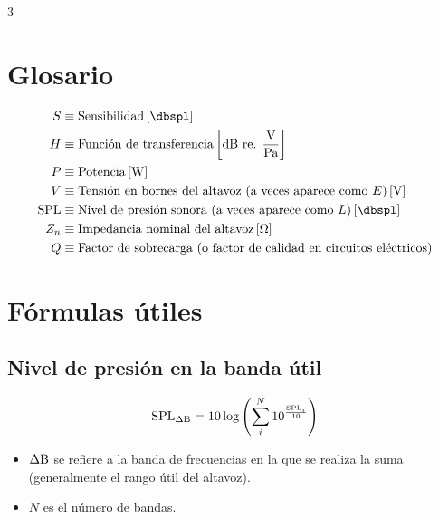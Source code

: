 \documentclass[a4paper, 8pt]{extarticle}
\begin{document}
\setlength{\parskip}{0pt}
\setlength{\parindent}{0pt}
\pagestyle{empty}
\renewcommand{\arraystretch}{1.5}

\begin{multicols}{3}
    \section{Glosario}
    \[
        \begin{alignedat}{2}
            S          & \equiv \text{Sensibilidad}  \left[ \unit{\dbspl} \right]                                                  \\
            H          & \equiv \text{Función de transferencia}  \left[ \unit{\dB} \text{ re. }\unit{\volt\per\pascal} \right]     \\
            P          & \equiv \text{Potencia} \left[ \unit{\watt} \right]                                                        \\
            V          & \equiv \text{Tensión en bornes del altavoz (a veces aparece como } E \text{)} \left[ \unit{\volt} \right] \\
            \text{SPL} & \equiv \text{Nivel de presión sonora (a veces aparece como } L \text{)} \left[ \unit{\dbspl} \right]      \\
            Z_n        & \equiv \text{Impedancia nominal del altavoz} \left[ \unit{\ohm} \right]                                   \\
            Q          & \equiv \text{Factor de sobrecarga (o factor de calidad en circuitos eléctricos)}                          \\
        \end{alignedat}
    \]

    \section{Fórmulas útiles}
    \subsection{Nivel de presión en la banda útil}
    \[
        \text{SPL}_{\Delta \textup{B}} = 10 \log \left( \sum_{i}^{N} 10^{\frac{\text{SPL}_i}{10}} \right)
    \]
    \color{gray}\begin{itemize}
        \item $\Delta \textup{B}$ se refiere a la banda de frecuencias en la que se realiza la suma (generalmente el rango útil del altavoz).
        \item $N$ es el número de bandas.
    \end{itemize}\color{black}


\end{multicols}
\end{document}
